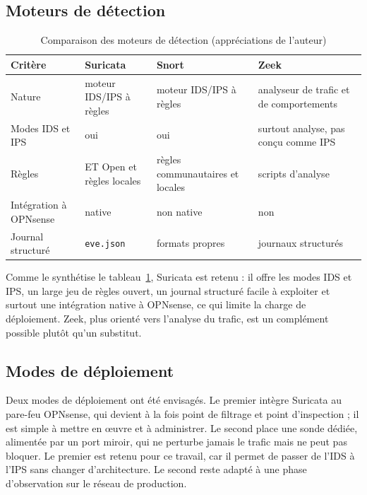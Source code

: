 \subsection{Moteurs de détection}

\begin{table}[htbp]
\centering
\small
\begin{tabularx}{\textwidth}{lXXX}
\hline
\textbf{Critère} & \textbf{Suricata} & \textbf{Snort} & \textbf{Zeek} \\
\hline
Nature & moteur IDS/IPS à règles & moteur IDS/IPS à règles & analyseur de trafic et de comportements \\
Modes IDS et IPS & oui\cite{suricatadoc} & oui & surtout analyse, pas conçu comme IPS \\
Règles & ET Open et règles locales & règles communautaires et locales & scripts d'analyse \\
Intégration à OPNsense & native\cite{opnsensedoc} & non native & non \\
Journal structuré & \texttt{eve.json} & formats propres & journaux structurés \\
\hline
\end{tabularx}
\caption{Comparaison des moteurs de détection (appréciations de l'auteur)}
\label{tab:comparatif}
\end{table}

Comme le synthétise le tableau~\ref{tab:comparatif}, Suricata est retenu : il offre les modes IDS et IPS, un large jeu de règles ouvert, un journal structuré facile à exploiter et surtout une intégration native à OPNsense, ce qui limite la charge de déploiement. Zeek, plus orienté vers l'analyse du trafic, est un complément possible plutôt qu'un substitut.

\subsection{Modes de déploiement}

Deux modes de déploiement ont été envisagés. Le premier intègre Suricata au pare-feu OPNsense, qui devient à la fois point de filtrage et point d'inspection ; il est simple à mettre en œuvre et à administrer. Le second place une sonde dédiée, alimentée par un port miroir, qui ne perturbe jamais le trafic mais ne peut pas bloquer. Le premier est retenu pour ce travail, car il permet de passer de l'IDS à l'IPS sans changer d'architecture. Le second reste adapté à une phase d'observation sur le réseau de production.


